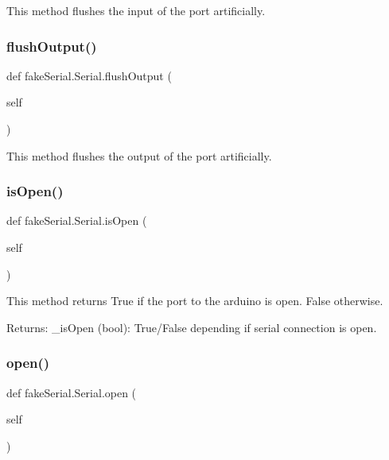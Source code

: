 \begin{DoxyVerb}This method flushes the input of the port artificially.
\end{DoxyVerb}
 \mbox{\label{classfake_serial_1_1_serial_afecff2730c11a9a8e7f687c57a2c738a}} 
\subsubsection{\texorpdfstring{flushOutput()}{flushOutput()}}
{\footnotesize\ttfamily def fake\+Serial.\+Serial.\+flush\+Output (\begin{DoxyParamCaption}\item[{}]{self }\end{DoxyParamCaption})}

\begin{DoxyVerb}This method flushes the output of the port artificially.
\end{DoxyVerb}
 \mbox{\label{classfake_serial_1_1_serial_a69cc2297e7c5bfb87de4df789774f3a2}} 
\subsubsection{\texorpdfstring{isOpen()}{isOpen()}}
{\footnotesize\ttfamily def fake\+Serial.\+Serial.\+is\+Open (\begin{DoxyParamCaption}\item[{}]{self }\end{DoxyParamCaption})}

\begin{DoxyVerb}This method returns True if the port to the arduino is open. False otherwise.

Returns:
    _isOpen (bool): True/False depending if serial connection is open.
\end{DoxyVerb}
 \mbox{\label{classfake_serial_1_1_serial_a2e4137a108e41f23e49735667d9b4c05}} 
\subsubsection{\texorpdfstring{open()}{open()}}
{\footnotesize\ttfamily def fake\+Serial.\+Serial.\+open (\begin{DoxyParamCaption}\item[{}]{self }\end{DoxyParamCaption})}

